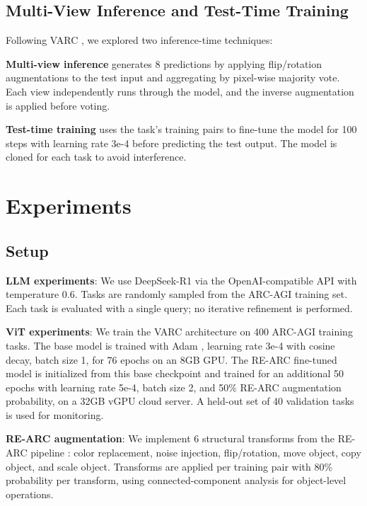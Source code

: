 \documentclass{article}
\begin{document}
\subsection{Multi-View Inference and Test-Time Training}

Following VARC \cite{arxiv2511.14761}, we explored two inference-time techniques:

\textbf{Multi-view inference} generates 8 predictions by applying flip/rotation augmentations to the test input and aggregating by pixel-wise majority vote. Each view independently runs through the model, and the inverse augmentation is applied before voting.

\textbf{Test-time training} uses the task's training pairs to fine-tune the model for 100 steps with learning rate 3e-4 before predicting the test output. The model is cloned for each task to avoid interference.

\section{Experiments}

\subsection{Setup}

\textbf{LLM experiments}: We use DeepSeek-R1 via the OpenAI-compatible API with temperature 0.6. Tasks are randomly sampled from the ARC-AGI training set. Each task is evaluated with a single query; no iterative refinement is performed.

\textbf{ViT experiments}: We train the VARC architecture on 400 ARC-AGI training tasks. The base model is trained with Adam \cite{kingma2015adam}, learning rate 3e-4 with cosine decay, batch size 1, for 76 epochs on an 8GB GPU. The RE-ARC fine-tuned model is initialized from this base checkpoint and trained for an additional 50 epochs with learning rate 5e-4, batch size 2, and 50\% RE-ARC augmentation probability, on a 32GB vGPU cloud server. A held-out set of 40 validation tasks is used for monitoring.

\textbf{RE-ARC augmentation}: We implement 6 structural transforms from the RE-ARC pipeline \cite{arxiv2511.14761}: color replacement, noise injection, flip/rotation, move object, copy object, and scale object. Transforms are applied per training pair with 80\% probability per transform, using connected-component analysis for object-level operations.
\end{document}
